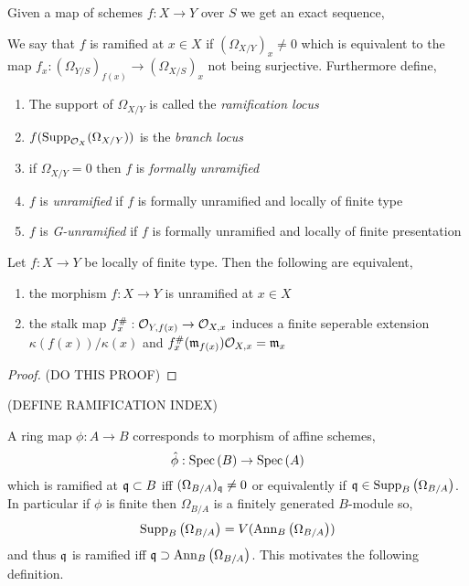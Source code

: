 \documentclass[12pt]{article}
\begin{document}
\begin{definition}
Given a map of schemes $f : X \to Y$ over $S$ we get an exact sequence,
\begin{center}
\end{center}
We say that $f$ is ramified at $x \in X$ if $(\Omega_{X / Y})_x \neq 0$ which is equivalent to the map $f_x : (\Omega_{Y / S})_{f(x)} \to (\Omega_{X / S})_x$ not being surjective. Furthermore define,
\begin{enumerate}
\item The support of $\Omega_{X / Y}$ is called the \textit{ramification locus}
\item $f(\mathrm{Supp}_{\mathcal{O}_{X}}(\Omega_{X/Y}))$ is the \textit{branch locus}
\item if $\Omega_{X/Y} = 0$ then $f$ is \textit{formally unramified}
\item $f$ is \textit{unramified} if $f$ is formally unramified and locally of finite type
\item $f$ is \textit{G-unramified} if $f$ is formally unramified and locally of finite presentation 
\end{enumerate}
\end{definition}

\begin{lemma}
Let $f : X \to Y$ be locally of finite type. Then the following are equivalent,
\begin{enumerate}
\item the morphism $f : X \to Y$ is unramified at $x \in X$ 
\item the stalk map $f^\#_x : \mathcal{O}_{Y, f(x)} \to \mathcal{O}_{X, x}$
induces a finite seperable extension $\kappa(f(x)) / \kappa(x)$ and $f^\#_x(\mathfrak{m}_{f(x)})\mathcal{O}_{X, x} = \mathfrak{m}_x$
\end{enumerate} 
\end{lemma}

\begin{proof}
(DO THIS PROOF)
\end{proof}

(DEFINE RAMIFICATION INDEX)

\begin{remark}
A ring map $\phi : A \to B$ corresponds to morphism of affine schemes,
\[ \hat{\phi} : \mathrm{Spec}\left( B \right) \to \mathrm{Spec}\left( A \right) \]
which is ramified at $\mathfrak{q} \subset B$ iff $(\Omega_{B / A})_{\mathfrak{q}} \neq 0$ or equivalently if $\mathfrak{q} \in \mathrm{Supp}_{B}\left(\Omega_{B / A} \right)$. 
\bigskip\\
In particular if $\phi$ is finite then $\Omega_{B / A}$ is a finitely generated $B$-module so,
\[ \mathrm{Supp}_{B}\left(\Omega_{B / A} \right) = V(\mathrm{Ann}_{B}\left(\Omega_{B/A}\right)) \]
and thus $\mathfrak{q}$ is ramified iff $\mathfrak{q} \supset \mathrm{Ann}_{B}\left(\Omega_{B/A}\right)$. This motivates the following definition. 
\end{remark}
\end{document}
